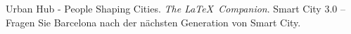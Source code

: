 \documentclass{article}
\begin{document}
\begin{thebibliography}{9}
\bibitem{}
Urban Hub - People Shaping Cities. 
\textit{The \LaTeX\ Companion}. 
Smart City 3.0 – Fragen Sie Barcelona nach der nächsten Generation von Smart City.



\end{thebibliography}
\end{document}
